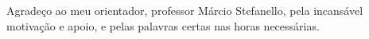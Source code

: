 Agradeço ao meu orientador, professor Márcio Stefanello, pela incansável
motivação e apoio, e pelas palavras certas nas horas necessárias.